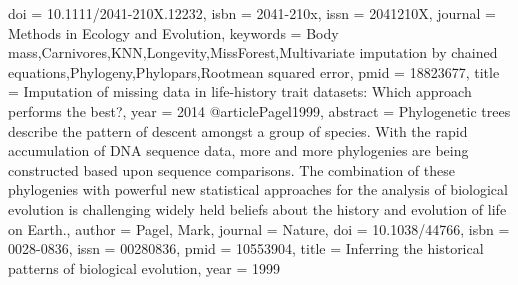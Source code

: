 {{{{{{doi = {10.1111/2041-210X.12232},
isbn = {2041-210x},
issn = {2041210X},
journal = {Methods in Ecology and Evolution},
keywords = {Body mass,Carnivores,KNN,Longevity,MissForest,Multivariate imputation by chained equations,Phylogeny,Phylopars,Rootmean squared error},
pmid = {18823677},
title = {{Imputation of missing data in life-history trait datasets: Which approach performs the best?}},
year = {2014}
}
@article{Pagel1999,
abstract = {Phylogenetic trees describe the pattern of descent amongst a group of species. With the rapid accumulation of DNA sequence data, more and more phylogenies are being constructed based upon sequence comparisons. The combination of these phylogenies with powerful new statistical approaches for the analysis of biological evolution is challenging widely held beliefs about the history and evolution of life on Earth.},
author = {Pagel, Mark},
journal = {Nature},
doi = {10.1038/44766},
isbn = {0028-0836},
issn = {00280836},
pmid = {10553904},
title = {{Inferring the historical patterns of biological evolution}},
year = {1999}
}

}}}}}
